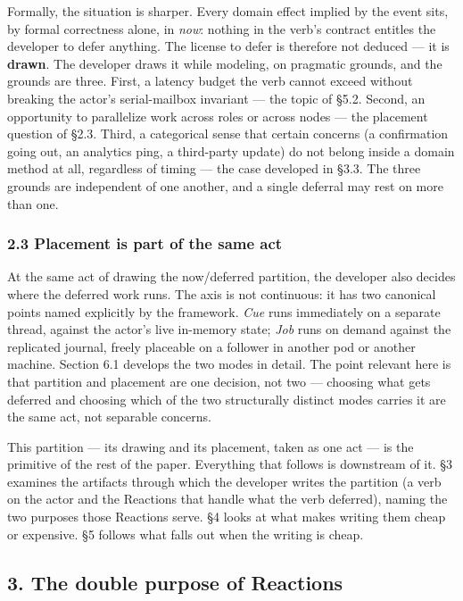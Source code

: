 \documentclass[
]{article}
\begin{document}
Formally, the situation is sharper. Every domain effect implied by the
event sits, by formal correctness alone, in \emph{now}: nothing in the
verb's contract entitles the developer to defer anything. The license to
defer is therefore not deduced --- it is \textbf{drawn}. The developer
draws it while modeling, on pragmatic grounds, and the grounds are
three. First, a latency budget the verb cannot exceed without breaking
the actor's serial-mailbox invariant --- the topic of §5.2. Second, an
opportunity to parallelize work across roles or across nodes --- the
placement question of §2.3. Third, a categorical sense that certain
concerns (a confirmation going out, an analytics ping, a third-party
update) do not belong inside a domain method at all, regardless of
timing --- the case developed in §3.3. The three grounds are independent
of one another, and a single deferral may rest on more than one.

\subsubsection{2.3 Placement is part of the same
act}\label{placement-is-part-of-the-same-act}

At the same act of drawing the now/deferred partition, the developer
also decides where the deferred work runs. The axis is not continuous:
it has two canonical points named explicitly by the framework.
\emph{Cue} runs immediately on a separate thread, against the actor's
live in-memory state; \emph{Job} runs on demand against the replicated
journal, freely placeable on a follower in another pod or another
machine. Section 6.1 develops the two modes in detail. The point
relevant here is that partition and placement are one decision, not two
--- choosing what gets deferred and choosing which of the two
structurally distinct modes carries it are the same act, not separable
concerns.

This partition --- its drawing and its placement, taken as one act ---
is the primitive of the rest of the paper. Everything that follows is
downstream of it. §3 examines the artifacts through which the developer
writes the partition (a verb on the actor and the Reactions that handle
what the verb deferred), naming the two purposes those Reactions serve.
§4 looks at what makes writing them cheap or expensive. §5 follows what
falls out when the writing is cheap.

\subsection{3. The double purpose of
Reactions}\label{the-double-purpose-of-reactions}
\end{document}

